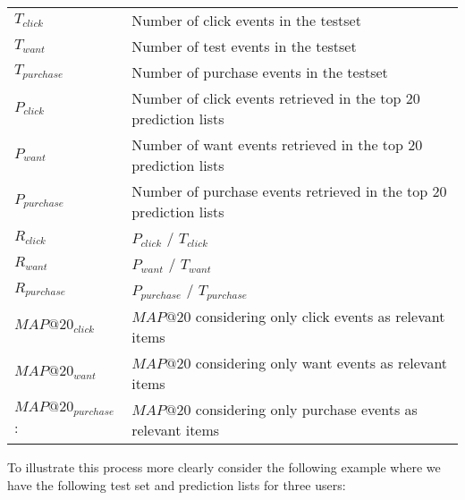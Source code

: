\begin{table}[H]
	\begin{tabular}{ll}
	\toprule
	$T_{click}$	 	 		& 	Number of click events in the testset \\
	$T_{want}$				&	Number of test events in the testset \\
	$T_{purchase}$	 		&	Number of purchase events in the testset \\
	$P_{click}$		 		&	Number of click events retrieved in the top 20 prediction lists \\
	$P_{want}$		 		&	Number of want events retrieved in the top 20 prediction lists \\
	$P_{purchase}$  		&	Number of purchase events retrieved in the top 20 prediction lists \\
	$R_{click}$				&	$P_{click}$ / $T_{click}$ \\
	$R_{want}$		 		&	$P_{want}$ / $T_{want}$  \\
	$R_{purchase}$	 		&	$P_{purchase}$ / $T_{purchase}$ \\
	$MAP@20_{click}$ 		&	$MAP@20$ considering only click events as relevant items \\
	$MAP@20_{want}$  		&	$MAP@20$ considering only want events as relevant items \\ 
	$MAP@20_{purchase}$: 	& 	$MAP@20$ considering only purchase events as relevant items \\
	\bottomrule
	\end{tabular}
\end{table}


To illustrate this process more clearly consider the following example where we have
the following test set and prediction lists for three users:

